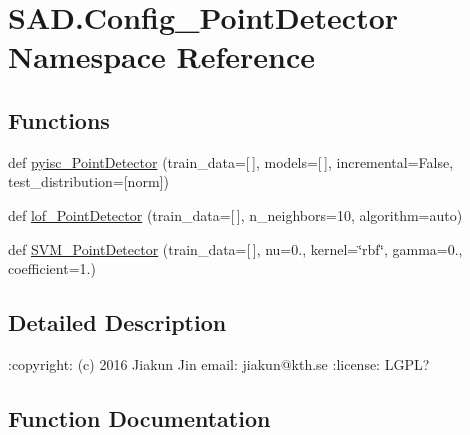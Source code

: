 \hypertarget{namespaceSAD_1_1Config__PointDetector}{}\section{S\+A\+D.\+Config\+\_\+\+Point\+Detector Namespace Reference}
\label{namespaceSAD_1_1Config__PointDetector}
\subsection*{Functions}
\begin{DoxyCompactItemize}
\item 
def \hyperlink{namespaceSAD_1_1Config__PointDetector_a4a47fd76139083b7d9f41d3997edf3f0}{pyisc\+\_\+\+Point\+Detector} (train\+\_\+data=\mbox{[}$\,$\mbox{]}, models=\mbox{[}$\,$\mbox{]}, incremental=False, test\+\_\+distribution=\mbox{[}\textquotesingle{}norm\textquotesingle{}\mbox{]})
\item 
def \hyperlink{namespaceSAD_1_1Config__PointDetector_a420441441318e4c5c12031e2e19dce98}{lof\+\_\+\+Point\+Detector} (train\+\_\+data=\mbox{[}$\,$\mbox{]}, n\+\_\+neighbors=10, algorithm=\textquotesingle{}auto\textquotesingle{})
\item 
def \hyperlink{namespaceSAD_1_1Config__PointDetector_a582467493e610c8f0ff0426f8a9172fe}{S\+V\+M\+\_\+\+Point\+Detector} (train\+\_\+data=\mbox{[}$\,$\mbox{]}, nu=0., kernel=\char`\"{}rbf\char`\"{}, gamma=0., coefficient=1.)
\end{DoxyCompactItemize}


\subsection{Detailed Description}
\begin{DoxyVerb}:copyright: (c) 2016 Jiakun Jin
email: jiakun@kth.se
:license: LGPL?
\end{DoxyVerb}
 

\subsection{Function Documentation}

